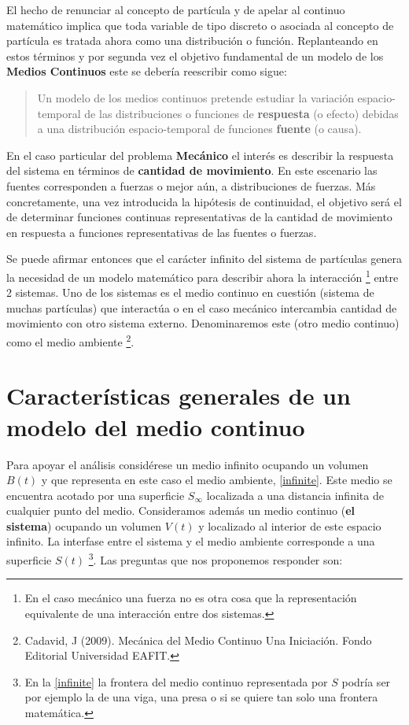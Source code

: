 \documentclass[../notas medios.tex]{subfiles}
\begin{document}
El hecho de renunciar al concepto de partícula y de apelar al continuo matemático implica que toda variable de tipo discreto o asociada al concepto de partícula es tratada ahora como una distribución o función.  Replanteando en estos términos y por segunda vez el objetivo fundamental de un modelo de los {\bf Medios Continuos} este se debería reescribir como sigue:
\begin{quote}
Un modelo de los medios continuos pretende estudiar la variación espacio-temporal de las distribuciones o funciones de {\bf respuesta} (o efecto) debidas a una distribución espacio-temporal de funciones {\bf fuente} (o causa).
\end{quote}

En el caso particular del problema {\bf Mecánico} el interés es describir la
respuesta del sistema en términos de {\bf cantidad de movimiento}.  En este escenario las fuentes corresponden a fuerzas o mejor aún, a distribuciones de fuerzas.  Más concretamente, una vez introducida la hipótesis de continuidad, el objetivo será el de determinar funciones continuas representativas de la cantidad de movimiento en respuesta a funciones representativas de las fuentes o fuerzas.

Se puede afirmar entonces que el carácter infinito del sistema de partículas genera la necesidad de un modelo matemático para describir ahora la interacción \footnote{En el caso mecánico una fuerza no es otra cosa que la representación equivalente de una interacción entre dos sistemas.} entre 2 sistemas.  Uno de los sistemas es el medio continuo en cuestión (sistema de muchas partículas) que interactúa o en el caso mecánico intercambia cantidad de movimiento con otro sistema externo.  Denominaremos este (otro medio continuo) como el medio ambiente \footnote{Cadavid, J (2009).  Mecánica del Medio Continuo Una Iniciación.  Fondo Editorial Universidad EAFIT.}.

\section{Características generales de un modelo del medio continuo}
Para apoyar el análisis considérese un medio infinito ocupando un volumen $B(t)$
y que representa en este caso el medio ambiente, \cref{infinite}. Este medio se
encuentra acotado por una superficie ${S_\infty }$ localizada a una distancia infinita de cualquier punto del medio.  Consideramos además un medio continuo ({\bf el sistema}) ocupando un volumen $V(t)$ y localizado al interior de este espacio infinito.  La interfase entre el sistema y el medio ambiente corresponde a una superficie $S(t)$ \footnote{En la \cref{infinite} la frontera del medio continuo representada por $S$ podría ser por ejemplo la de una viga, una presa o si se quiere tan solo una frontera matemática.}. Las preguntas que nos proponemos responder son:
\end{document}
